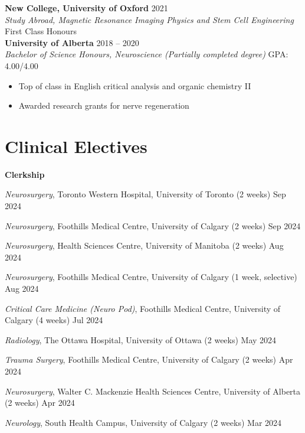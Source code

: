 \documentclass{article}
\begin{document}
\textbf{New College, University of Oxford} \hfill 2021 \\
\textit{Study Abroad, Magnetic Resonance Imaging Physics and Stem Cell Engineering} \hfill First Class Honours \\

\textbf{University of Alberta} \hfill 2018 -- 2020 \\
\textit{Bachelor of Science Honours, Neuroscience (Partially completed degree)} \hfill GPA: 4.00/4.00
\begin{itemize}
    \item Top of class in English critical analysis and organic chemistry II
    \item Awarded research grants for nerve regeneration
\end{itemize}


\section*{\textcolor{my_colour}{Clinical Electives}}
\vspace{-.25em} \hrulefill \vspace{.25em}

\textbf{Clerkship}

\textit{Neurosurgery}, Toronto Western Hospital, University of Toronto (2 weeks) \hfill Sep 2024

\textit{Neurosurgery}, Foothills Medical Centre, University of Calgary (2 weeks) \hfill Sep 2024

\textit{Neurosurgery}, Health Sciences Centre, University of Manitoba (2 weeks) \hfill Aug 2024

\textit{Neurosurgery}, Foothills Medical Centre, University of Calgary (1 week, selective) \hfill Aug 2024

\textit{Critical Care Medicine (Neuro Pod)}, Foothills Medical Centre, University of Calgary (4 weeks) \hfill Jul 2024

\textit{Radiology}, The Ottawa Hospital, University of Ottawa (2 weeks) \hfill May 2024

\textit{Trauma Surgery}, Foothills Medical Centre, University of Calgary (2 weeks) \hfill Apr 2024

\textit{Neurosurgery}, Walter C. Mackenzie Health Sciences Centre, University of Alberta (2 weeks) \hfill Apr 2024

\textit{Neurology}, South Health Campus, University of Calgary (2 weeks) \hfill Mar 2024
\end{document}
